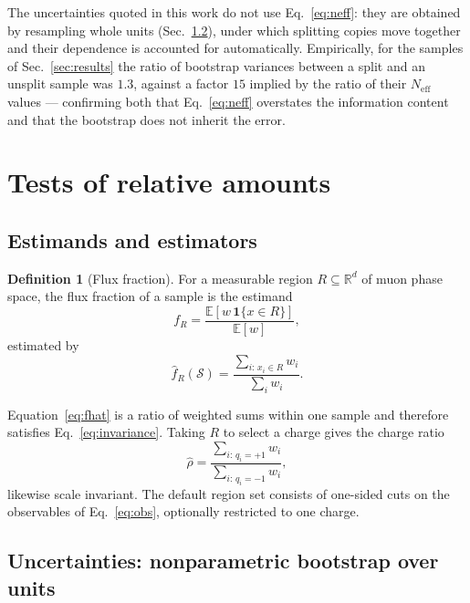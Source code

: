 \documentclass[11pt,a4paper]{article}
\theoremstyle{definition}
\newtheorem{definition}{Definition}[section]
\theoremstyle{plain}
\theoremstyle{remark}
\newcommand{\Neff}{N_{\mathrm{eff}}}
\newcommand{\Ind}{\mathbf{1}}
\newcommand{\Exp}{\mathbb{E}}
\begin{document}
The uncertainties quoted in this work do not use Eq.~\eqref{eq:neff}: they are
obtained by resampling whole units (Sec.~\ref{sec:bootstrap}), under which
splitting copies move together and their dependence is accounted for
automatically. Empirically, for the samples of Sec.~\ref{sec:results} the ratio
of bootstrap variances between a split and an unsplit sample was $1.3$, against
a factor $15$ implied by the ratio of their $\Neff$ values --- confirming both
that Eq.~\eqref{eq:neff} overstates the information content and that the
bootstrap does not inherit the error.

\section{Tests of relative amounts}
\label{sec:fractions}

\subsection{Estimands and estimators}

\begin{definition}[Flux fraction]
For a measurable region $R \subseteq \mathbb{R}^d$ of muon phase space, the
flux fraction of a sample is the estimand
\begin{equation}
  f_R = \frac{\Exp\!\left[w\,\Ind\{x \in R\}\right]}{\Exp[w]},
\end{equation}
estimated by
\begin{equation}
  \hat{f}_R(\mathcal{S})
  = \frac{\sum_{i:\,x_i \in R} w_i}{\sum_{i} w_i}.
  \label{eq:fhat}
\end{equation}
\end{definition}

Equation~\eqref{eq:fhat} is a ratio of weighted sums within one sample and
therefore satisfies Eq.~\eqref{eq:invariance}. Taking $R$ to select a charge
gives the charge ratio
\begin{equation}
  \hat{\rho} = \frac{\sum_{i:\, q_i = +1} w_i}{\sum_{i:\, q_i = -1} w_i},
\end{equation}
likewise scale invariant. The default region set consists of one-sided cuts on
the observables of Eq.~\eqref{eq:obs}, optionally restricted to one charge.

\subsection{Uncertainties: nonparametric bootstrap over units}
\label{sec:bootstrap}
\end{document}

